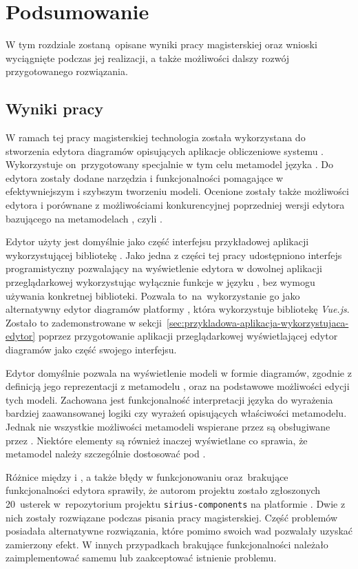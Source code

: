 \chapter{Podsumowanie}

W tym rozdziale zostaną opisane wyniki pracy magisterskiej oraz wnioski
wyciągnięte podczas jej realizacji, a także możliwości dalszy rozwój
przygotowanego rozwiązania.

\section{Wyniki pracy}

W ramach tej pracy magisterskiej technologia \SiriusWeb{} została
wykorzystana do stworzenia edytora diagramów opisujących aplikacje obliczeniowe
systemu \BalticLSC{}. Wykorzystuje on~przygotowany specjalnie w tym celu
metamodel \EMF{} języka \CAL{}. Do edytora zostały dodane narzędzia i
funkcjonalności pomagające w efektywniejszym i szybszym tworzeniu modeli.
Ocenione zostały także możliwości edytora i porównane z możliwościami
konkurencyjnej poprzedniej wersji edytora bazującego na metamodelach \EMF{},
czyli \SiriusDesktop{}.

Edytor użyty jest domyślnie jako część interfejsu przykładowej aplikacji
wykorzystującej bibliotekę \React{}.
Jako jedna z części tej pracy udostępniono interfejs programistyczny
pozwalający na wyświetlenie edytora w dowolnej aplikacji przeglądarkowej
wykorzystując wyłącznie funkcje w języku \JavaScript{}, bez wymogu używania
konkretnej biblioteki.
Pozwala to~na~wykorzystanie go jako
alternatywny edytor diagramów platformy \BalticLSC{}, która wykorzystuje
bibliotekę \emph{Vue.js}. Zostało to
zademonstrowane w sekcji~\ref{sec:przykladowa-aplikacja-wykorzystujaca-edytor}
poprzez przygotowanie aplikacji przeglądarkowej wyświetlającej
edytor diagramów jako część swojego interfejsu.

Edytor domyślnie pozwala na wyświetlenie modeli w formie diagramów, zgodnie z
definicją jego reprezentacji z metamodelu \EMF{}, oraz na podstawowe
możliwości
edycji tych modeli. Zachowana jest funkcjonalność interpretacji języka
 do wyrażenia bardziej zaawansowanej logiki czy wyrażeń
opisujących
właściwości metamodelu. Jednak nie wszystkie możliwości metamodeli \EMF{}
wspierane przez \SiriusDesktop{} są obsługiwane przez \SiriusWeb{}.
Niektóre elementy są również inaczej wyświetlane co sprawia, że metamodel
należy szczególnie dostosować pod \SiriusWeb{}.

Różnice między \SiriusWeb{} i \SiriusDesktop{}, a także błędy w
funkcjonowaniu oraz~brakujące funkcjonalności edytora sprawiły, że autorom
projektu zostało zgłoszonych 20~usterek w~repozytorium projektu
\texttt{sirius-components} na platformie \GitHub{}. Dwie z nich zostały
rozwiązane podczas pisania pracy magisterskiej. Część problemów posiadała
alternatywne rozwiązania, które pomimo swoich wad pozwalały uzyskać zamierzony
efekt. W innych przypadkach brakujące funkcjonalności należało zaimplementować
samemu lub zaakceptować istnienie problemu.

